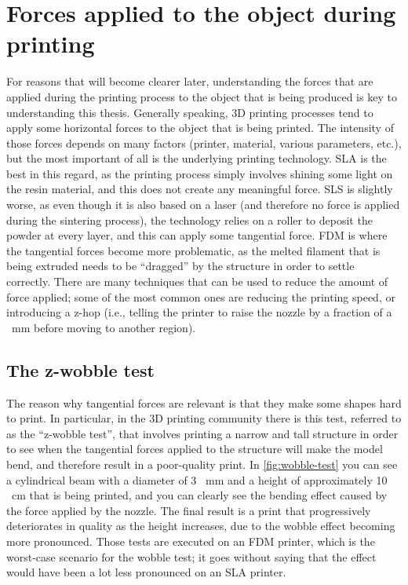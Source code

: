 \section{Forces applied to the object during printing}
\label{sec:tang_forces}

For reasons that will become clearer later, understanding the forces that are applied during
the printing process to the object that is being produced is key to understanding this
thesis.
Generally speaking, 3D printing processes tend to apply some horizontal forces to the object that
is being printed. The intensity of those forces depends on many factors (printer, material,
various parameters, etc.), but the most important of all is the underlying printing technology.
SLA is the best in this regard, as the printing process simply involves
shining some light on the resin material, and this does not create any meaningful force.
SLS is slightly worse, as even though it is also based on a laser (and therefore no
force is applied during the sintering process), the technology relies on a roller to deposit
the powder at every layer, and this can apply some tangential force.
FDM is where the tangential forces become more problematic, as the melted filament that is being
extruded needs to be ``dragged'' by the structure in order to settle correctly.
There are many techniques that can be used to reduce the amount of force applied; some of the most
common ones are reducing the printing speed, or introducing a z-hop (i.e., telling the printer to
raise the nozzle by a fraction of a \SI{}{\milli\metre} before moving to another region).


\subsection{The z-wobble test}
\label{sec:wobble-test}

The reason why tangential forces are relevant is that they make some shapes hard to print.
In particular, in the 3D printing community there is this test, referred to as the ``z-wobble test'',
that involves printing a narrow and tall structure in order to see when the tangential forces
applied to the structure will make the model bend, and therefore result in a poor-quality print.
In \cref{fig:wobble-test} you can see a cylindrical beam with a diameter of
3 \SI{}{\milli\metre} and a height of approximately 10 \SI{}{\centi\metre} that is being printed,
and you can clearly see the bending effect caused by the force applied by the nozzle.
The final result is a print that progressively deteriorates in quality as the height increases,
due to the wobble effect becoming more pronounced.
Those tests are executed on an FDM printer, which is the worst-case scenario for the wobble test;
it goes without saying that the effect would have been a lot less pronounced on an SLA printer.




